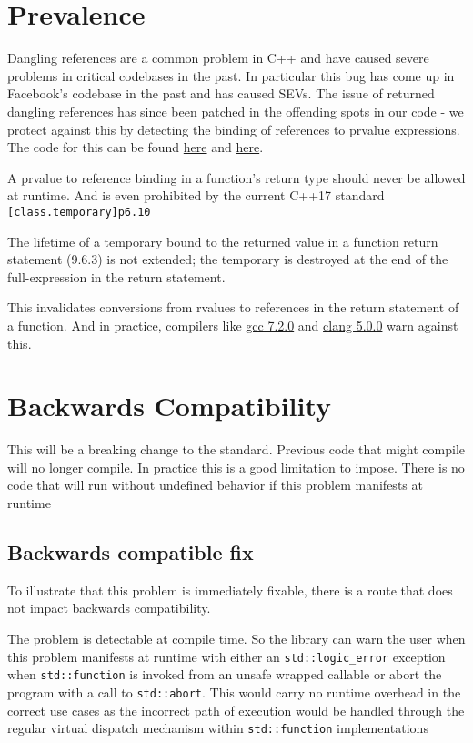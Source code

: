 \documentclass{article}
\begin{document}
\section{Prevalence}
Dangling references are a common problem in C++ and have caused severe
problems in critical codebases in the past.  In particular this bug has come
up in Facebook's codebase in the past and has caused SEVs.  The issue of
returned dangling references has since been patched in the offending spots in
our code - we protect against this by detecting the binding of references to
prvalue expressions.  The code for this can be found
\href{https://goo.gl/7uiti4}{here} and \href{https://goo.gl/Wa7NGr}{here}.

A prvalue to reference binding in a function's return type should never be
allowed at runtime.  And is even prohibited by the current C++17 standard
\texttt{[class.temporary]p6.10}
\begin{displayquote}
The lifetime of a temporary bound to the returned value in a function return
statement (9.6.3) is not extended; the temporary is destroyed at the end of
the full-expression in the return statement.
\end{displayquote}

This invalidates conversions from rvalues to references in the return
statement of a function.  And in practice, compilers like
\href{https://wandbox.org/permlink/qZI97GJdtllIVnTn}{gcc 7.2.0} and
\href{https://wandbox.org/permlink/lOCOoY0qnSJwIQ8j}{clang 5.0.0} warn against
this.

\section{Backwards Compatibility}
This will be a breaking change to the standard.  Previous code that might
compile will no longer compile.  In practice this is a good limitation to
impose.  There is no code that will run without undefined behavior if this
problem manifests at runtime

\subsection{Backwards compatible fix}
To illustrate that this problem is immediately fixable, there is a route that
does not impact backwards compatibility.

The problem is detectable at compile time.  So the library can warn the user
when this problem manifests at runtime with either an
\texttt{std::logic\_error} exception when \texttt{std::function} is invoked
from an unsafe wrapped callable or abort the program with a call to
\texttt{std::abort}.  This would carry no runtime overhead in the correct use
cases as the incorrect path of execution would be handled through the regular
virtual dispatch mechanism within \texttt{std::function} implementations
\end{document}
